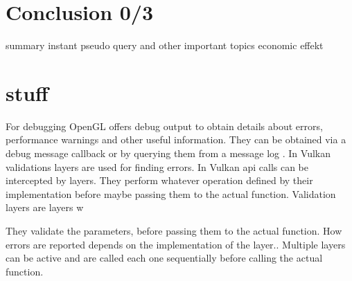 \section{Conclusion 0/3}

summary
instant pseudo query and other important topics
economic effekt

\section*{stuff}
For debugging OpenGL offers debug output to obtain details about errors, performance warnings and other useful information. They can be obtained via a debug message callback or by querying them from a message log \cite{khronos:openGL:spec4.6}. In Vulkan validations layers are used for finding errors. In Vulkan \gls{api} calls can be intercepted by layers. They perform whatever operation defined by their implementation before maybe passing them to the actual function. Validation layers are layers w

They validate the parameters, before passing them to the actual function. How errors are reported depends on the implementation of the layer.. Multiple layers can be active and are called each one sequentially before calling the actual function. \cite{khronos:vulkan:spec1.1}












